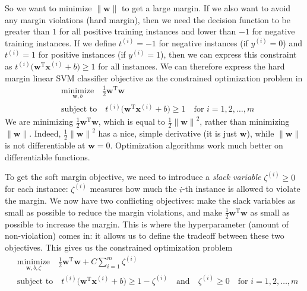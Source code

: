 So we want to minimize $\|\mathbf{w}\|$ to get a large margin. If we also want to avoid any margin violations (hard margin), then we need the decision function to be greater than $1$ for all positive training instances and lower than $-1$ for negative training instances. If we define $t^{(i)}=-1$ for negative instances (if $y^{(i)}=0$) and $t^{(i)}=1$ for positive instances (if $y^{(i)}=1$), then we can express this constraint as $t^{(i)}\bigl(\mathbf{w}^{\mathrm{T}}\mathbf{x}^{(i)}+b\bigr)\geq1$ for all instances. We can therefore express the hard margin linear SVM classifier objective as the constrained optimization problem in
\begin{align*}
&\underset{\mathbf{w},b}{\text{minimize}}\quad\frac{1}{2}\mathbf{w}^{\mathrm{T}}\mathbf{w}\\
&\text{subject to}\quad t^{(i)}\bigl(\mathbf{w}^{\mathrm{T}}\mathbf{x}^{(i)}+b\bigr)\geq1\quad\text{for $i=1,2,\ldots,m$}
\end{align*}
We are minimizing $\frac{1}{2}\mathbf{w}^{\mathrm{T}}\mathbf{w}$, which is equal to $\frac{1}{2}{\|\mathbf{w}\|}^2$, rather than minimizing $\|\mathbf{w}\|$. Indeed, $\frac{1}{2}{\|\mathbf{w}\|}^2$ has a nice, simple derivative (it is just $\mathbf{w}$), while $\|\mathbf{w}\|$ is not differentiable at $\mathbf{w}=0$. Optimization algorithms work much better on differentiable functions.

To get the soft margin objective, we need to introduce a \emph{slack variable} $\zeta^{(i)}\geq0$ for each instance: $\zeta^{(i)}$ measures how much the $i$-th instance is allowed to violate the margin. We now have two conflicting objectives: make the slack variables as small as possible to reduce the margin violations, and make $\frac{1}{2}\mathbf{w}^{\mathrm{T}}\mathbf{w}$ as small as possible to increase the margin. This is where the  hyperparameter (amount of non-violation) comes in: it allows us to define the tradeoff between these two objectives. This gives us the constrained optimization problem
\begin{align*}
&\underset{\mathbf{w},b,\zeta}{\text{minimize}}\quad\frac{1}{2}\mathbf{w}^{\mathrm{T}}\mathbf{w}+C\sum_{i=1}^m\zeta^{(i)}\\
&\text{subject to}\quad t^{(i)}\bigl(\mathbf{w}^{\mathrm{T}}\mathbf{x}^{(i)}+b\bigr)\geq1-\zeta^{(i)}\quad\text{and}\quad\zeta^{(i)}\geq0\quad\text{for $i=1,2,\ldots,m$}
\end{align*}
